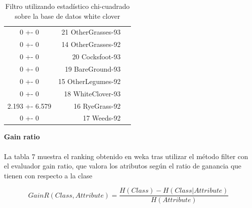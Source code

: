 \documentclass[es]{ifirak}
\begin{document}
\begin{table}[htbp]
\begin{tabular}{|c|rl|}
		  0     +- 0    &  21 OtherGrasses-93 &  \\
		  0     +- 0    &  14 OtherGrasses-92 &  \\
		  0     +- 0    &     20 Cocksfoot-93 &  \\
		  0     +- 0    &    19 BareGround-93 &  \\
		  0     +- 0    &  15 OtherLegumes-92 &  \\
		  0     +- 0    &   18 WhiteClover-93 &  \\
		2.193 +- 6.579  &      16 RyeGrass-92 &  \\
		  0     +- 0    &         17 Weeds-92 &
	\end{tabular}
	\caption{Filtro utilizando estadístico chi-cuadrado sobre la base de datos white clover}\label{table}
\end{table}
\pagebreak

\textbf{Gain ratio}
\paragraph{}
La tabla 7 muestra el ranking obtenido en weka tras utilizar el método filter con el evaluador gain ratio, que valora los atributos según el ratio de ganancia que tienen con respecto a la clase

\begin{displaymath}
GainR(Class, Attribute) =\dfrac {H(Class) - H(Class | Attribute)}{H(Attribute)}
\end{displaymath}
\end{document}

